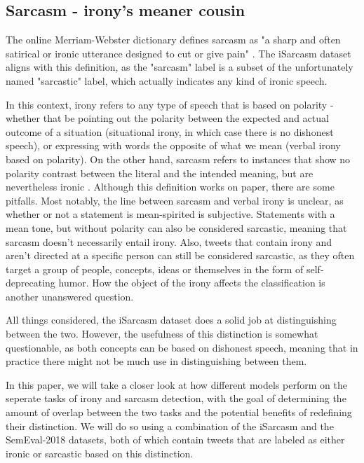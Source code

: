 \documentclass[10pt, a4paper]{article}
\begin{document}
 
\subsection{Sarcasm - irony's meaner cousin}\label{sec:sarcasm_definition}
The online Merriam-Webster dictionary defines sarcasm as "a sharp and often satirical or ironic utterance designed to 
cut or give pain" \citep{mw-dictionary}. The iSarcasm dataset \citep{iSarcasm} aligns with this definition, as 
the "sarcasm" label is a subset of the unfortunately named "sarcastic" label, which actually 
indicates any kind of ironic speech. 

In this context, irony refers to any type of speech that is based on polarity - whether that be pointing out the polarity 
between the expected and actual outcome of a situation (situational irony, in which case there is no dishonest speech), or expressing with words the opposite of what 
we mean (verbal irony based on polarity). On the other hand, sarcasm refers to instances that show no polarity contrast between the
literal and the intended meaning, but are nevertheless ironic \citep{semeval-2018}.
Although this definition works on paper, there are some pitfalls. Most notably, 
the line between sarcasm and verbal irony is unclear, as whether or not a statement is mean-spirited is subjective.
Statements with a mean tone, but without polarity can also be considered sarcastic, meaning that sarcasm doesn't necessarily entail irony.
Also, tweets that contain irony and aren’t directed at a 
specific person can still be considered sarcastic, as they often target a group of people, concepts, ideas or themselves 
in the form of self-deprecating humor. How the object of the irony affects the classification is another unanswered question.

All things considered, the iSarcasm \citep{iSarcasm} dataset
does a solid job at distinguishing between the two. However, the usefulness of this distinction is somewhat questionable, 
as both concepts can be based on dishonest speech, meaning that in practice there might not be much use in distinguishing
 between them.

In this paper, we will take a closer look at how different models perform on the seperate tasks of irony and sarcasm detection,
with the goal of determining the amount of overlap between the two tasks and the potential benefits of redefining their distinction.
We will do so using a combination of the iSarcasm \citep{iSarcasm} and the SemEval-2018 \citep{semeval-2018} 
datasets, both of which contain tweets that are labeled as either ironic or sarcastic based on this distinction.
\end{document}
